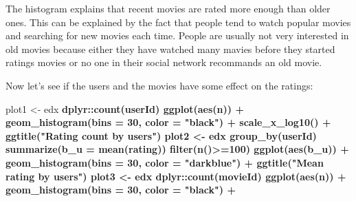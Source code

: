 \documentclass[]{article}
\newenvironment{Shaded}{\begin{snugshade}}{\end{snugshade}}
\newcommand{\KeywordTok}[1]{\textcolor[rgb]{0.13,0.29,0.53}{\textbf{#1}}}
\newcommand{\DataTypeTok}[1]{\textcolor[rgb]{0.13,0.29,0.53}{#1}}
\newcommand{\DecValTok}[1]{\textcolor[rgb]{0.00,0.00,0.81}{#1}}
\newcommand{\StringTok}[1]{\textcolor[rgb]{0.31,0.60,0.02}{#1}}
\newcommand{\OperatorTok}[1]{\textcolor[rgb]{0.81,0.36,0.00}{\textbf{#1}}}
\newcommand{\NormalTok}[1]{#1}
\begin{document}
The histogram explains that recent movies are rated more enough than
older ones. This can be explained by the fact that people tend to watch
popular movies and searching for new movies each time. People are
usually not very interested in old movies because either they have
watched many mavies before they started ratings movies or no one in
their social network recommands an old movie.

Now let's see if the users and the movies have some effect on the
ratings:

\begin{Shaded}
\begin{Highlighting}[]
\NormalTok{plot1 <-}\StringTok{ }\NormalTok{edx }\OperatorTok{%
\NormalTok{dplyr}\OperatorTok{::}\KeywordTok{count}\NormalTok{(userId) }\OperatorTok{%
\StringTok{  }\KeywordTok{ggplot}\NormalTok{(}\KeywordTok{aes}\NormalTok{(n)) }\OperatorTok{+}\StringTok{ }
\StringTok{  }\KeywordTok{geom_histogram}\NormalTok{(}\DataTypeTok{bins =} \DecValTok{30}\NormalTok{, }\DataTypeTok{color =} \StringTok{"black"}\NormalTok{) }\OperatorTok{+}\StringTok{ }
\StringTok{  }\KeywordTok{scale_x_log10}\NormalTok{() }\OperatorTok{+}\StringTok{ }
\StringTok{  }\KeywordTok{ggtitle}\NormalTok{(}\StringTok{"Rating count by users"}\NormalTok{)}
\NormalTok{plot2 <-}\StringTok{ }\NormalTok{edx }\OperatorTok{%
\StringTok{  }\KeywordTok{group_by}\NormalTok{(userId) }\OperatorTok{%
\StringTok{  }\KeywordTok{summarize}\NormalTok{(}\DataTypeTok{b_u =} \KeywordTok{mean}\NormalTok{(rating)) }\OperatorTok{%
\StringTok{  }\KeywordTok{filter}\NormalTok{(}\KeywordTok{n}\NormalTok{()}\OperatorTok{>=}\DecValTok{100}\NormalTok{) }\OperatorTok{%
\StringTok{  }\KeywordTok{ggplot}\NormalTok{(}\KeywordTok{aes}\NormalTok{(b_u)) }\OperatorTok{+}\StringTok{ }
\StringTok{  }\KeywordTok{geom_histogram}\NormalTok{(}\DataTypeTok{bins =} \DecValTok{30}\NormalTok{, }\DataTypeTok{color =} \StringTok{"darkblue"}\NormalTok{) }\OperatorTok{+}
\StringTok{  }\KeywordTok{ggtitle}\NormalTok{(}\StringTok{"Mean rating by users"}\NormalTok{)}
\NormalTok{plot3 <-}\StringTok{ }\NormalTok{edx }\OperatorTok{%
\StringTok{  }\NormalTok{dplyr}\OperatorTok{::}\KeywordTok{count}\NormalTok{(movieId) }\OperatorTok{%
\StringTok{  }\KeywordTok{ggplot}\NormalTok{(}\KeywordTok{aes}\NormalTok{(n)) }\OperatorTok{+}\StringTok{ }
\StringTok{  }\KeywordTok{geom_histogram}\NormalTok{(}\DataTypeTok{bins =} \DecValTok{30}\NormalTok{, }\DataTypeTok{color =} \StringTok{"black"}\NormalTok{) }\OperatorTok{+}\StringTok{ }
}}}}}}}}
\end{Highlighting}
\end{Shaded}
\end{document}
